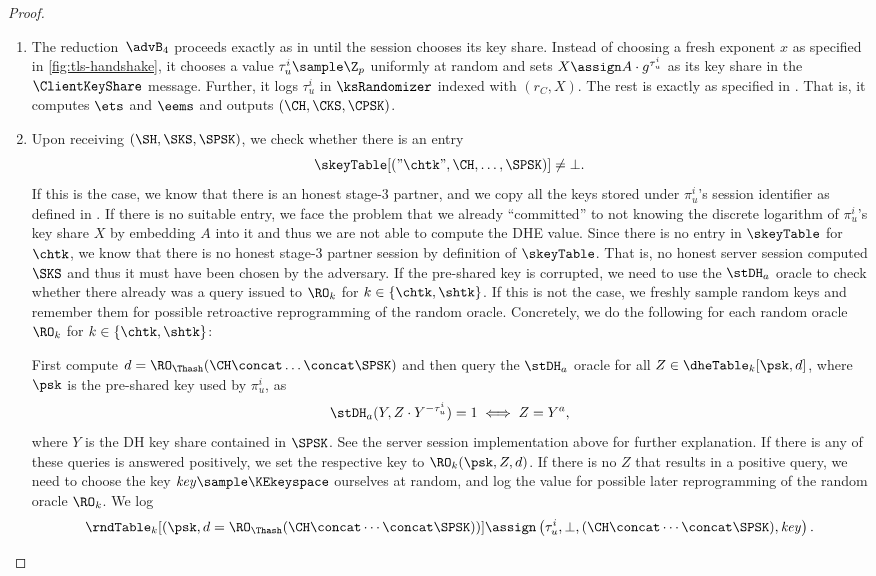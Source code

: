 \begin{proof}
	\begin{enumerate}
		\item The reduction~$\advB_4$ proceeds exactly as in \thisGame until the session chooses its key share.
		Instead of choosing a fresh exponent $x$ as specified in \autoref{fig:tls-handshake}, it chooses a value $\tau_u^i \sample \Z_p$ uniformly at random and sets $X \assign A \cdot g^{\tau_u^i}$ as its key share in the $\ClientKeyShare$ message.
		Further, it logs $\tau_u^i$ in $\ksRandomizer$ indexed with $(r_C, X)$.
		The rest is exactly as specified in \thisGame. 
		That is, it computes $\ets$ and $\eems$ and outputs $(\CH, \CKS, \CPSK)$.
%		
		\item 	Upon receiving $(\SH,\SKS, \SPSK)$, we check whether there is an entry 
		\[
			\skeyTable[("\chtk",\CH, \dotsc, \SPSK)] \neq \bot.
		\]
		If this is the case, we know that there is an honest stage-$3$ partner, and we copy all the keys stored under $\pi_u^i$'s session identifier as defined in \thisGame.
		If there is no suitable entry, we face the problem that we already ``committed'' to not knowing the discrete logarithm of $\pi_u^i$'s key share $X$ by embedding $A$ into it and thus we are not able to compute the DHE value.
		Since there is no entry in $\skeyTable$ for $\chtk$, we know that there is no honest stage-$3$ partner session by definition of $\skeyTable$.
		That is, no honest server session computed $\SKS$ and thus it must have been chosen by the adversary.
		If the pre-shared key is corrupted, we need to use the $\stDH_a$ oracle to check whether there already was a query issued to $\RO_k$ for $k \in \{\chtk, \shtk\}$.
		If this is not the case, we freshly sample random keys and remember them for possible retroactive reprogramming of the random oracle.
		Concretely, we do the following for each random oracle $\RO_{k}$ for $k \in \{\chtk, \shtk\}$:
		
		First compute $d = \RO_\Thash(\CH \concat \dotsc \concat \SPSK)$ and then query the $\stDH_a$ oracle for all $Z \in \dheTable_k[\psk, d]$, where $\psk$ is the pre-shared key used by $\pi_u^i$, as
		\[
			\stDH_a(Y, Z \cdot Y^{-\tau_u^i}) = 1 \iff Z = Y^a,
		\]
		where $Y$ is the DH key share contained in $\SPSK$.
		See the server session implementation above for further explanation.
		If there is any of these queries is answered positively, we set the respective key to $\RO_{k}(\psk, Z, d)$.
		If there is no $Z$ that results in a positive query, we need to choose the key $\mathit{key} \sample \KEkeyspace$ ourselves at random, and log the value for possible later reprogramming of the random oracle $\RO_{k}$.
		We log
		\[
			\rndTable_k[(\psk, d = \RO_\Thash(\CH \concat \dotsb \concat \SPSK) )] \assign \left(  \tau_u^i, \bot, (\CH \concat \dotsb \concat \SPSK), \mathit{key} \right).
		\]
		

\end{enumerate}
\end{proof}
